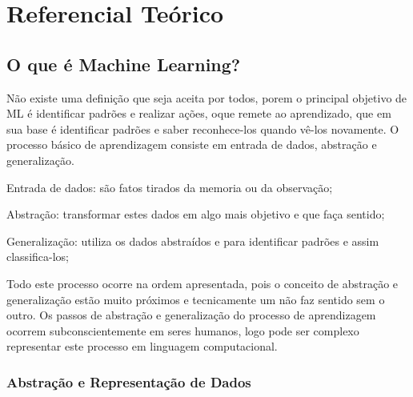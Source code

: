 \chapter{Referencial Teórico}
\label{cap:referencial-reorico}

\section{O que é Machine Learning?}
\label{sec:oqueemachinelearning}

Não existe uma definição que seja aceita por todos, porem o principal objetivo de ML é identificar padrões e realizar ações, oque remete ao aprendizado,
que em sua base é identificar padrões e saber reconhece-los quando vê-los novamente. O processo básico de aprendizagem consiste em entrada de dados, abstração e generalização.
\begin{alineas}
	\item Entrada de dados: são fatos tirados da memoria ou da observação;
	\item Abstração: transformar estes dados em algo mais objetivo e que faça sentido;
	\item Generalização: utiliza os dados abstraídos e para  identificar padrões e assim classifica-los;			
\end{alineas}

\begin{figure}[h!]
	\centering
\end{figure}

Todo este processo ocorre na ordem apresentada, pois o conceito de abstração e generalização estão muito próximos e tecnicamente um não faz sentido sem o outro. Os passos de abstração e generalização do processo de aprendizagem ocorrem subconscientemente em seres humanos, logo pode ser complexo representar este processo em linguagem computacional.


\subsection{Abstração e Representação de Dados}
\label{cap:abs-representacao-dados}

